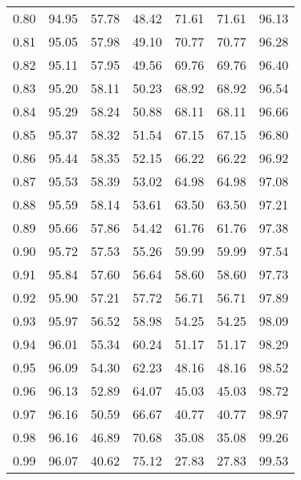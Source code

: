 \begin{tabular}{|c|c|c|c|c|c|c|}
      0.80 &     94.95 &     57.78 &      48.42 &   71.61 &      71.61 &         96.13 \\
      0.81 &     95.05 &     57.98 &      49.10 &   70.77 &      70.77 &         96.28 \\
      0.82 &     95.11 &     57.95 &      49.56 &   69.76 &      69.76 &         96.40 \\
      0.83 &     95.20 &     58.11 &      50.23 &   68.92 &      68.92 &         96.54 \\
      0.84 &     95.29 &     58.24 &      50.88 &   68.11 &      68.11 &         96.66 \\
      0.85 &     95.37 &     58.32 &      51.54 &   67.15 &      67.15 &         96.80 \\
      0.86 &     95.44 &     58.35 &      52.15 &   66.22 &      66.22 &         96.92 \\
      0.87 &     95.53 &     58.39 &      53.02 &   64.98 &      64.98 &         97.08 \\
      0.88 &     95.59 &     58.14 &      53.61 &   63.50 &      63.50 &         97.21 \\
      0.89 &     95.66 &     57.86 &      54.42 &   61.76 &      61.76 &         97.38 \\
      0.90 &     95.72 &     57.53 &      55.26 &   59.99 &      59.99 &         97.54 \\
      0.91 &     95.84 &     57.60 &      56.64 &   58.60 &      58.60 &         97.73 \\
      0.92 &     95.90 &     57.21 &      57.72 &   56.71 &      56.71 &         97.89 \\
      0.93 &     95.97 &     56.52 &      58.98 &   54.25 &      54.25 &         98.09 \\
      0.94 &     96.01 &     55.34 &      60.24 &   51.17 &      51.17 &         98.29 \\
      0.95 &     96.09 &     54.30 &      62.23 &   48.16 &      48.16 &         98.52 \\
      0.96 &     96.13 &     52.89 &      64.07 &   45.03 &      45.03 &         98.72 \\
      0.97 &     96.16 &     50.59 &      66.67 &   40.77 &      40.77 &         98.97 \\
      0.98 &     96.16 &     46.89 &      70.68 &   35.08 &      35.08 &         99.26 \\
      0.99 &     96.07 &     40.62 &      75.12 &   27.83 &      27.83 &         99.53 \\
\bottomrule
\end{tabular}
